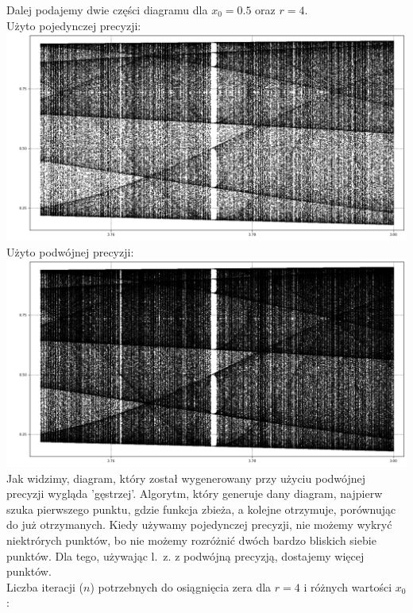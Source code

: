 \documentclass[12pt,a4paper]{article}
\begin{document}
  Dalej podajemy dwie części diagramu dla $x_0 = 0.5$ oraz $r = 4$. \vspace{3mm}\\
  Użyto pojedynczej precyzji:\newline
  \includegraphics[width=1\textwidth]{img/sp} \newline
  Użyto podwójnej precyzji: \newline
  \includegraphics[width=1\textwidth]{img/dp} \newline
  Jak widzimy, diagram, który został wygenerowany przy użyciu podwójnej precyzji
  wygląda 'gęstrzej'. Algorytm, który generuje dany diagram, najpierw szuka
  pierwszego punktu, gdzie funkcja zbieża, a kolejne otrzymuje, porównując do
  już otrzymanych. Kiedy używamy pojedynczej precyzji, nie możemy wykryć
  niektrórych punktów, bo nie możemy rozróżnić dwóch bardzo bliskich siebie
  punktów. Dla tego, używając l.~z. z podwójną precyzją, dostajemy więcej
  punktów. \vspace{3mm}\\
  Liczba iteracji ($n$) potrzebnych do osiągnięcia zera dla $r = 4$ i
  różnych wartości $x_0$: \\
\end{document}
